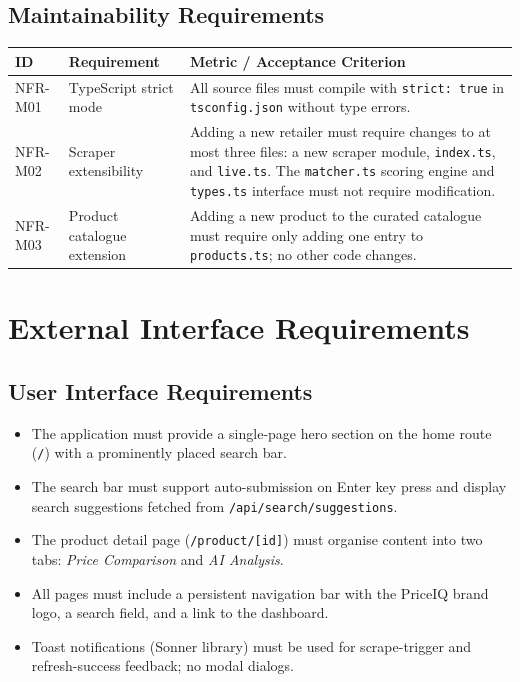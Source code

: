 \documentclass[12pt,a4paper]{report}
\begin{document}
\section{Maintainability Requirements}

\begin{longtable}{L{2cm} L{4cm} L{7cm}}
  \toprule
  \textbf{ID} & \textbf{Requirement} & \textbf{Metric / Acceptance Criterion} \\
  \midrule
  \endhead
  NFR-M01 & TypeScript strict mode &
    All source files must compile with \texttt{strict: true} in
    \texttt{tsconfig.json} without type errors. \\[3pt]
  NFR-M02 & Scraper extensibility &
    Adding a new retailer must require changes to at most three files:
    a new scraper module, \texttt{index.ts}, and \texttt{live.ts}. The
    \texttt{matcher.ts} scoring engine and \texttt{types.ts} interface must
    not require modification. \\[3pt]
  NFR-M03 & Product catalogue extension &
    Adding a new product to the curated catalogue must require only adding
    one entry to \texttt{products.ts}; no other code changes. \\
  \bottomrule
\end{longtable}

\chapter{External Interface Requirements}

\section{User Interface Requirements}
\begin{itemize}[noitemsep]
  \item The application must provide a single-page hero section on the home
        route (\texttt{/}) with a prominently placed search bar.
  \item The search bar must support auto-submission on Enter key press and
        display search suggestions fetched from
        \texttt{/api/search/suggestions}.
  \item The product detail page (\texttt{/product/[id]}) must organise content
        into two tabs: \emph{Price Comparison} and \emph{AI Analysis}.
  \item All pages must include a persistent navigation bar with the PriceIQ
        brand logo, a search field, and a link to the dashboard.
  \item Toast notifications (Sonner library) must be used for scrape-trigger
        and refresh-success feedback; no modal dialogs.
\end{itemize}
\end{document}
